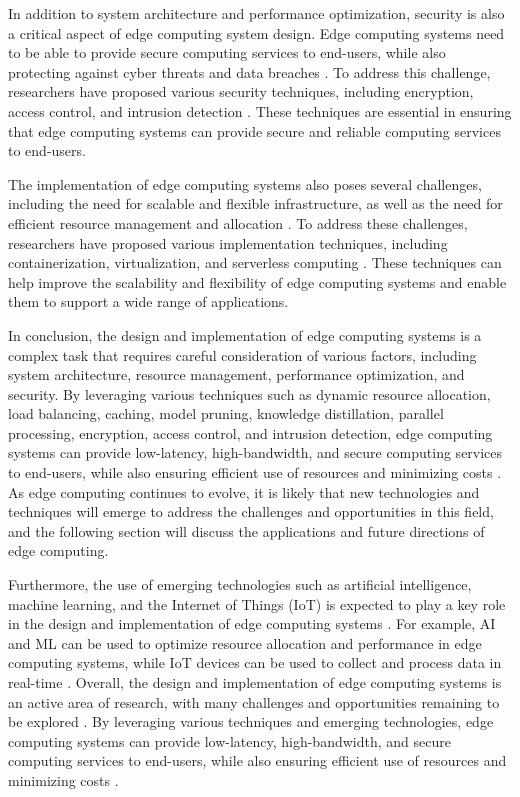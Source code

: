 \documentclass[11pt]{article}
\begin{document}
In addition to system architecture and performance optimization, security is also a critical aspect of edge computing system design. Edge computing systems need to be able to provide secure computing services to end-users, while also protecting against cyber threats and data breaches \cite{ref15}. To address this challenge, researchers have proposed various security techniques, including encryption, access control, and intrusion detection \cite{ref38}. These techniques are essential in ensuring that edge computing systems can provide secure and reliable computing services to end-users.

The implementation of edge computing systems also poses several challenges, including the need for scalable and flexible infrastructure, as well as the need for efficient resource management and allocation \cite{ref39}. To address these challenges, researchers have proposed various implementation techniques, including containerization, virtualization, and serverless computing \cite{ref40}. These techniques can help improve the scalability and flexibility of edge computing systems and enable them to support a wide range of applications.

In conclusion, the design and implementation of edge computing systems is a complex task that requires careful consideration of various factors, including system architecture, resource management, performance optimization, and security. By leveraging various techniques such as dynamic resource allocation, load balancing, caching, model pruning, knowledge distillation, parallel processing, encryption, access control, and intrusion detection, edge computing systems can provide low-latency, high-bandwidth, and secure computing services to end-users, while also ensuring efficient use of resources and minimizing costs \cite{ref41}. As edge computing continues to evolve, it is likely that new technologies and techniques will emerge to address the challenges and opportunities in this field, and the following section will discuss the applications and future directions of edge computing.

Furthermore, the use of emerging technologies such as artificial intelligence, machine learning, and the Internet of Things (IoT) is expected to play a key role in the design and implementation of edge computing systems \cite{ref11}. For example, AI and ML can be used to optimize resource allocation and performance in edge computing systems, while IoT devices can be used to collect and process data in real-time \cite{ref42}. Overall, the design and implementation of edge computing systems is an active area of research, with many challenges and opportunities remaining to be explored \cite{ref43}. By leveraging various techniques and emerging technologies, edge computing systems can provide low-latency, high-bandwidth, and secure computing services to end-users, while also ensuring efficient use of resources and minimizing costs \cite{ref44}.
\end{document}
